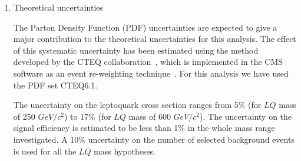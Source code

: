 \begin{enumerate}

\item Theoretical uncertainties 

The Parton Density Function (PDF) uncertainties are expected to give 
a major contribution to the theoretical uncertainties for this analysis.  
The effect of this systematic uncertainty has been estimated
using the method developed by the CTEQ collaboration~\cite{Martin:2003sk},
which is implemented in the CMS software as an event re-weighting technique~\cite{PDFRescaling}.
For this analysis we have used the PDF set CTEQ6.1.



The uncertainty on the leptoquark cross section ranges 
from 5\% (for $LQ$ mass of 250 $GeV/c^2$) to 17\% (for $LQ$ mass of 600 $GeV/c^2$).  
The uncertainty on the signal efficiency is estimated to be less 
than 1\% in the whole mass range investigated.
A 10\% uncertainty on the number of selected background events is used for all the 
$LQ$ mass hypotheses. 


\end{enumerate}
